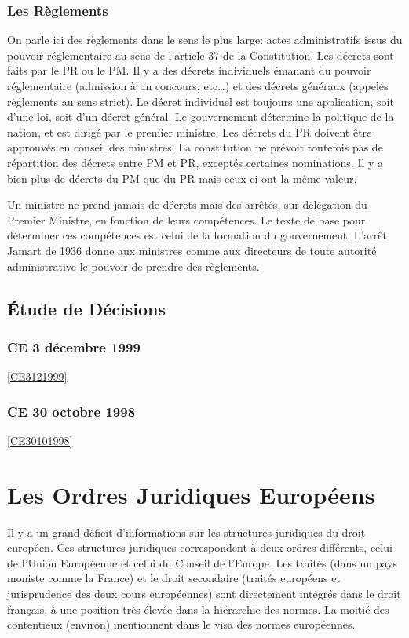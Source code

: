 \documentclass[math]{cours}
\begin{document}
\subsubsection{Les Règlements}
On parle ici des règlements dans le sens le plus large: actes administratifs issus du pouvoir réglementaire au sens de l'article 37 de la Constitution.
Les décrets sont faits par le PR ou le PM.
Il y a des décrets individuels émanant du pouvoir réglementaire (admission à un concours, etc\ldots) et des décrets généraux (appelés règlements au sens strict).
Le décret individuel est toujours une application, soit d'une loi, soit d'un décret général.
Le gouvernement détermine la politique de la nation, et est dirigé par le premier ministre.
Les décrets du PR doivent être approuvés en conseil des ministres.
La constitution ne prévoit toutefois pas de répartition des décrets entre PM et PR, exceptés certaines nominations.
Il y a bien plus de décrets du PM que du PR mais ceux ci ont la même valeur.

\medskip

Un ministre ne prend jamais de décrets mais des arrêtés, sur délégation du Premier Ministre, en fonction de leurs compétences.
Le texte de base pour déterminer ces compétences est celui de la formation du gouvernement.
L'arrêt Jamart de 1936 donne aux ministres comme aux directeurs de toute autorité administrative le pouvoir de prendre des règlements.

\subsection{Étude de Décisions}
\subsubsection{CE 3 décembre 1999}
\ref{CE3121999}

\subsubsection{CE 30 octobre 1998}
\ref{CE30101998}

\section{Les Ordres Juridiques Européens}
Il y a un grand déficit d'informations sur les structures juridiques du droit européen.
Ces structures juridiques correspondent à deux ordres différents, celui de l'Union Européenne et celui du Conseil de l'Europe.
Les traités (dans un pays moniste comme la France) et le droit secondaire (traités européens et jurisprudence des deux cours européennes) sont directement intégrés dans le droit français, à une position très élevée dans la hiérarchie des normes.
La moitié des contentieux (environ) mentionnent dans le visa des normes européennes.
\end{document}
